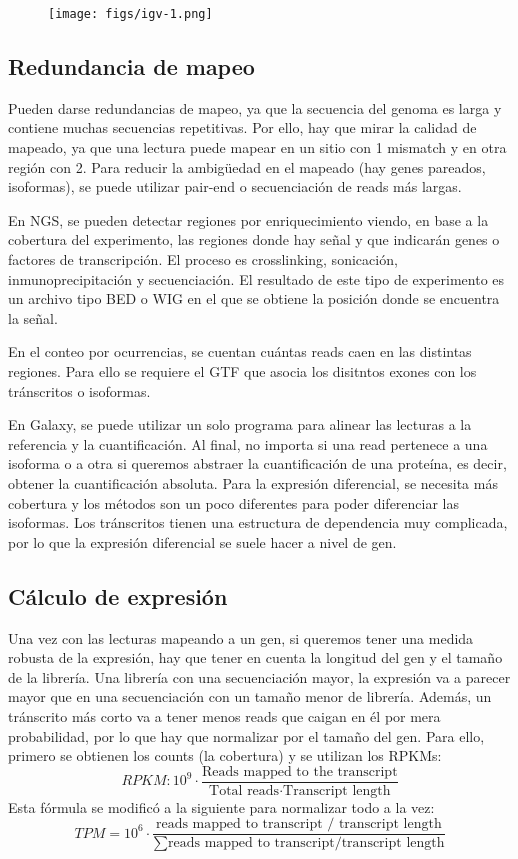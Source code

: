 \begin{figure}[h]
\centering
\texttt{[image: figs/igv-1.png]}
\end{figure}

\subsection{Redundancia de mapeo}
Pueden darse redundancias de mapeo, ya que la secuencia del genoma es larga y contiene muchas secuencias repetitivas. Por ello, hay que mirar la calidad de mapeado, ya que una lectura puede mapear en un sitio con 1 mismatch y en otra región con 2. Para reducir la ambigüedad en el mapeado (hay genes pareados, isoformas), se puede utilizar pair-end o secuenciación de reads más largas. 

En NGS, se pueden detectar regiones por enriquecimiento viendo, en base a la cobertura del experimento, las regiones donde hay señal y que indicarán genes o factores de transcripción. El proceso es crosslinking, sonicación, inmunoprecipitación y secuenciación. El resultado de este tipo de experimento es un archivo tipo BED o WIG en el que se obtiene la posición donde se encuentra la señal.

En el conteo por ocurrencias, se cuentan cuántas reads caen en las distintas regiones. Para ello se requiere el GTF que asocia los disitntos exones con los tránscritos o isoformas.

En Galaxy, se puede utilizar un solo programa para alinear las lecturas a la referencia y la cuantificación. Al final, no importa si una read pertenece a una isoforma o a otra si queremos abstraer la cuantificación de una proteína, es decir, obtener la cuantificación absoluta. Para la expresión diferencial, se necesita más cobertura y los métodos son un poco diferentes para poder diferenciar las isoformas. Los tránscritos tienen una estructura de dependencia muy complicada, por lo que la expresión diferencial se suele hacer a nivel de gen.

\subsection{Cálculo de expresión}
Una vez con las lecturas mapeando a un gen, si queremos tener una medida robusta de la expresión, hay que tener en cuenta la longitud del gen y el tamaño de la librería. Una librería con una secuenciación mayor, la expresión va a parecer mayor que en una secuenciación con un tamaño menor de librería. Además, un tránscrito más corto va a tener menos reads que caigan en él por mera probabilidad, por lo que hay que normalizar por el tamaño del gen. Para ello, primero se obtienen los counts (la cobertura) y se utilizan los RPKMs:
$$RPKM: 10^9 \cdot \frac{\text{Reads mapped to the transcript}}{\text{Total reads} \cdot \text{Transcript length}}$$
Esta fórmula se modificó a la siguiente para normalizar todo a la vez:
$$TPM = 10^6 \cdot \frac{\text{reads mapped to transcript / transcript length}}{\sum \text{reads mapped to transcript/transcript length}}$$

